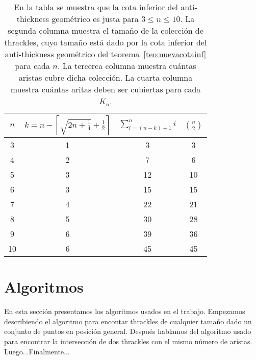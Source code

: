 \begin{table}[t]
  \centering
  \begin{tabular}{|c|c|c|c|}
    \hline
    $n$ & $k=n - \left\lceil\sqrt{2n+\frac{1}{4}} + \frac{1}{2}\right\rceil$ & $\sum^n_{i=(n-k) + 1}i$ & $\binom{n}{2}$\\[5pt] \hline\hline
    3   & 1  & 3 & 3 \\ \hline
    4   & 2  & 7 & 6 \\ \hline
    5   & 3  & 12 & 10 \\ \hline
    6   & 3  & 15 & 15 \\ \hline
    7   & 4  & 22 & 21 \\ \hline
    8   & 5  & 30 & 28 \\ \hline
    9   & 6  & 39 & 36 \\ \hline
    10  & 6  & 45 & 45 \\ \hline
  \end{tabular}
  \caption{En la tabla se muestra que la cota inferior del anti-thickness geométrico es justa para $3 \leq n \leq 10$. La segunda columna muestra el tamaño de la colección de thrackles, cuyo tamaño está dado por la cota inferior del anti-thickness geométrico del teorema~\ref{teo:nuevacotainf} para cada $n$. La tercerca columna muestra cuántas aristas cubre dicha colección. La cuarta columna muestra cuántas aritas deben ser cubiertas para cada $K_n$.}
  \label{table:atnuevacota}
\end{table}

\section{Algoritmos}\label{seccion_algoritmos}
En esta sección presentamos los algoritmos usados en el trabajo. Empezamos
describiendo el algoritmo para encontar thrackles de cualquier tamaño dado
un conjunto de puntos en posición general. Después hablamos del algoritmo
usado para encontrar la intersección de dos thrackles con el mismo número de
aristas. Luego...Finalmente...


